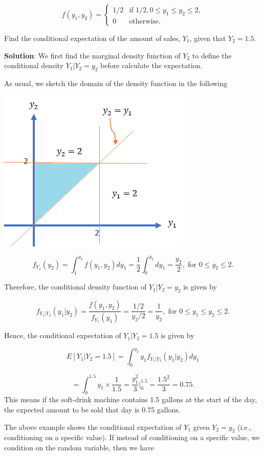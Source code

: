 \documentclass[
]{book}
\begin{document}
\[
\displaystyle f(y_1, y_2) = \begin{cases} 
 1/2 & \text{if $1/2, 0 \le y_1 \le y_2 \le 2$}, \\  
 0 & \text{otherwise}.
 \end{cases}
\]

Find the conditional expectation of the amount of sales, \(Y_1\), given that \(Y_2 = 1.5\).

\textbf{Solution}: We first find the marginal density function of \(Y_2\) to define the conditional density \(Y_1|Y_2 = y_2\) before calculate the expectation.

As usual, we sketch the domain of the density function in the following

\begin{center}\includegraphics[width=0.4\linewidth]{topic09/example02Domain} \end{center}

\[
f_{Y_2}(y_2) = \int_1^{y_2}f(y_1,y_2)dy_1 = \frac{1}{2}\int_0^{y_2}dy_1 = \frac{y_2}{2}, \text{ for } 0 \le y_2 \le 2.
\]

Therefore, the conditional density function of \(Y_1|Y_2 = y_2\) is given by

\[
f_{Y_1|Y_2}(y_1|y_2) = \frac{f(y_1,y_2)}{f_{Y_1}(y_1)} = \frac{1/2}{y_2/2} = \frac{1}{y_2}, \text{ for } 0 \le y_1 \le y_2 \le 2.
\]

Hence, the conditional expectation of \(Y_1|Y_2 = 1.5\) is given by

\[
E[Y_1|Y_2 = 1.5] = \int_0^{y_2}y_1 f_{Y_1|Y_2}(y_1|y_2)dy_1 
\]

\[
= \int_0^{1.5}y_1 \times \frac{1}{1.5} = \frac{y_1^2}{3}\Bigg|_0^{1.5} = \frac{1.5^2}{3}=0.75.
\]
This means if the soft-drink machine contains 1.5 gallons at the start of the day, the expected amount to be sold that day is 0.75 gallons.

The above example shows the conditional expectation of \(Y_1\) given \(Y_2=y_2\) (i.e., conditioning on a specific value). If instead of conditioning on a specific value, we condition on the random variable, then we have
\end{document}
